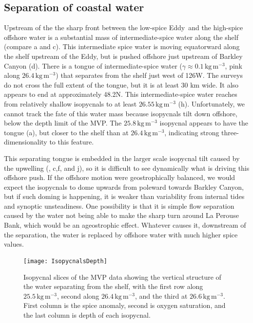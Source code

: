 \documentclass[draft]{agujournal2019}
\newcommand*{\Eddy}{{\sc Eddy}}
\begin{document}
\subsection{Separation of coastal water}

Upstream of the the sharp front between the low-spice \Eddy\ and the high-spice offshore water is a substantial mass of intermediate-spice water along the shelf (compare a and c).   This intermediate spice water is moving equatorward along the shelf upstream of the \Eddy, but is pushed offshore just upstream of Barkley Canyon (d).  There is a tongue of intermediate-spice water ($\gamma \approx 0.1\,\mathrm{kg\,m^{-3}}$, pink along $26.4\,\mathrm{kg\,m^{-3}}$) that separates from the shelf just west of 126\textdegree W. The surveys do not cross the full extent of the  tongue, but it is at least 30 km wide. It also appears to end at approximately 48.2\textdegree N.  This intermediate-spice water reaches from relatively shallow isopycnals to at least $26.55\,\mathrm{kg\,m^{-3}}$ (h).  Unfortunately, we cannot track the fate of this water mass because isopycnals tilt down offshore, below the depth limit of the MVP.   The $25.8\,\mathrm{kg\,m^{-3}}$ isopycnal appears to have the tongue (a), but closer to the shelf than at $26.4\,\mathrm{kg\,m^{-3}}$, indicating strong three-dimensionality to this feature.

This separating tongue is embedded in the larger scale isopycnal tilt caused by the upwelling (, c,f, and j), so it is difficult to see dynamically what is driving this offshore push.  If the offshore motion were geostrophically balanced, we would expect the isopycnals to dome upwards from poleward towards Barkley Canyon, but if such doming is happening, it is weaker than variability from internal tides and synoptic unsteadiness. One possibility is that it is simple flow separation caused by the water not being able to make the sharp turn around La Perouse Bank, which would be an ageostrophic effect.  Whatever causes it, downstream of the separation, the water is replaced by offshore water with much higher spice values.

\begin{figure}[htbp]
  \begin{center}
    \texttt{[image: IsopycnalsDepth]}
    \caption{Isopycnal slices of the MVP data showing the vertical structure of the water separating from the shelf, with the first row along $25.5 \,\mathrm{kg\,m^{-3}}$, second along $26.4\,\mathrm{kg\,m^{-3}}$, and the third at $26.6\,\mathrm{kg\,m^{-3}}$.  First column is the spice anomaly, second is oxygen saturation, and the last column is depth of each isopycnal.
      \label{fig:IsopycnalsDepth} }
  \end{center}
\end{figure}
\end{document}
